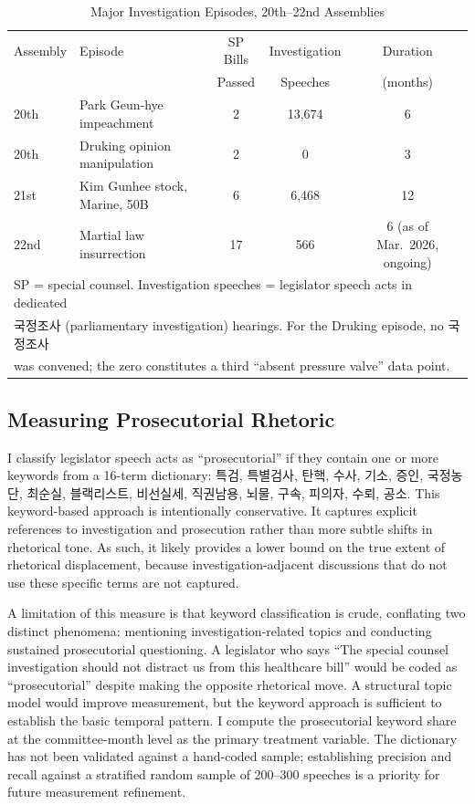 \documentclass[11pt]{article}
\begin{document}
\begin{table}[htbp]
\centering
\caption{Major Investigation Episodes, 20th--22nd Assemblies}
\label{tab:episodes}
\begin{tabular}{llccc}
\toprule
Assembly & Episode & SP Bills & Investigation & Duration \\
 & & Passed & Speeches & (months) \\
\midrule
20th & Park Geun-hye impeachment & 2 & 13,674 & 6 \\
20th & Druking opinion manipulation & 2 & 0 & 3 \\
21st & Kim Gunhee stock, Marine, 50B & 6 & 6,468 & 12 \\
22nd & Martial law insurrection & 17 & 566 & 6 (as of Mar.\ 2026, ongoing) \\
\bottomrule
\multicolumn{5}{l}{\footnotesize SP = special counsel. Investigation speeches = legislator speech acts in dedicated} \\
\multicolumn{5}{l}{\footnotesize 국정조사 (parliamentary investigation) hearings. For the Druking episode, no 국정조사} \\
\multicolumn{5}{l}{\footnotesize was convened; the zero constitutes a third ``absent pressure valve'' data point.} \\
\end{tabular}
\end{table}

\subsection{Measuring Prosecutorial Rhetoric}

I classify legislator speech acts as ``prosecutorial'' if they contain one or more keywords from a 16-term dictionary: 특검, 특별검사, 탄핵, 수사, 기소, 증인, 국정농단, 최순실, 블랙리스트, 비선실세, 직권남용, 뇌물, 구속, 피의자, 수뢰, 공소. This keyword-based approach is intentionally conservative. It captures explicit references to investigation and prosecution rather than more subtle shifts in rhetorical tone. As such, it likely provides a lower bound on the true extent of rhetorical displacement, because investigation-adjacent discussions that do not use these specific terms are not captured.

A limitation of this measure is that keyword classification is crude, conflating two distinct phenomena: mentioning investigation-related topics and conducting sustained prosecutorial questioning. A legislator who says ``The special counsel investigation should not distract us from this healthcare bill'' would be coded as ``prosecutorial'' despite making the opposite rhetorical move. A structural topic model would improve measurement, but the keyword approach is sufficient to establish the basic temporal pattern. I compute the prosecutorial keyword share at the committee-month level as the primary treatment variable. The dictionary has not been validated against a hand-coded sample; establishing precision and recall against a stratified random sample of 200--300 speeches is a priority for future measurement refinement.
\end{document}
